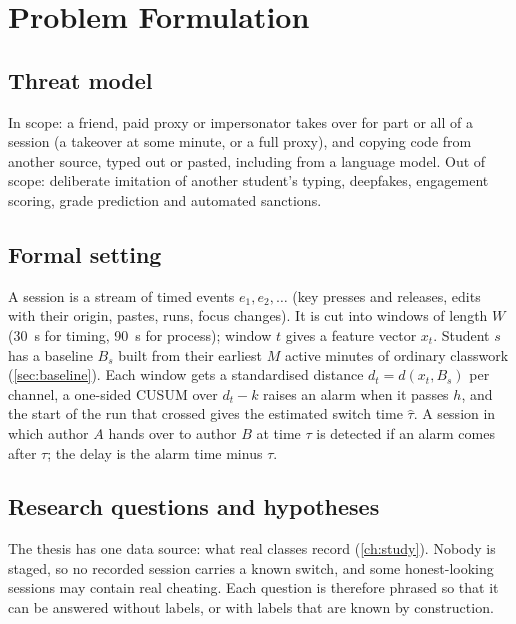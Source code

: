 \chapter{Problem Formulation}
\label{ch:problem}

\section{Threat model}
In scope: a friend, paid proxy or impersonator takes over for part or all
of a session (a takeover at some minute, or a full proxy), and copying code
from another source, typed out or pasted, including from a language model.
Out of scope: deliberate imitation of another student's typing, deepfakes,
engagement scoring, grade prediction and automated sanctions.

\section{Formal setting}
A session is a stream of timed events $e_1, e_2, \dots$ (key presses and
releases, edits with their origin, pastes, runs, focus changes). It is cut into
windows of length $W$ (\SI{30}{\second} for timing, \SI{90}{\second} for process);
window $t$ gives a feature vector $x_t$. Student $s$ has a baseline $B_s$ built
from their earliest $M$ active minutes of ordinary classwork (\cref{sec:baseline}).
Each window gets a standardised distance $d_t = d(x_t, B_s)$ per channel, a
one-sided CUSUM over $d_t - k$ raises an alarm when it passes $h$, and the start
of the run that crossed gives the estimated switch time $\hat\tau$. A session in
which author $A$ hands over to author $B$ at time $\tau$ is detected if an alarm
comes after $\tau$; the delay is the alarm time minus $\tau$.

\section{Research questions and hypotheses}
The thesis has one data source: what real classes record (\cref{ch:study}). Nobody
is staged, so no recorded session carries a known switch, and some honest-looking
sessions may contain real cheating. Each question is therefore phrased so that it
can be answered without labels, or with labels that are known by construction.

